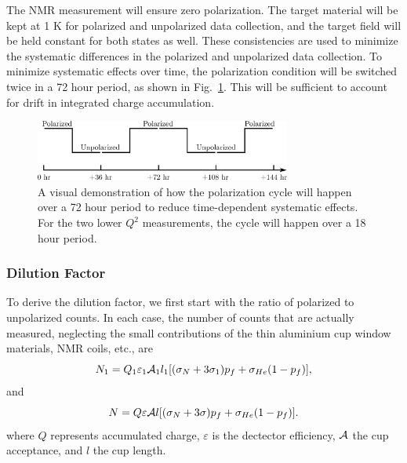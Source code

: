 The NMR measurement will ensure zero polarization.  The target material will be
kept at 1 K for polarized and unpolarized data collection, and the target field
will be held constant for both states as well.  These
consistencies are used to minimize the systematic differences in the
polarized and unpolarized data collection.  To minimize systematic effects over
time, the polarization condition will be switched twice in a 72 hour period, as shown in Fig.~\ref{fig:polcycle}. 
This will be sufficient to account for drift in integrated charge accumulation.

\begin{figure}
\centering
\includegraphics[width=0.75\textwidth,clip]{figs/pol_cycle.eps}
\caption{A visual demonstration of how the polarization cycle will happen over a 72 hour period to reduce time-dependent systematic effects. For the two lower $Q^2$ measurements, the cycle will happen over a 18 hour period.}  
\label{fig:polcycle}
\end{figure}



\subsubsection{Dilution Factor}
\label{dil}
To derive the dilution factor, we first start with the ratio of 
polarized to unpolarized counts.
In each case, the number of counts that are actually measured,  neglecting 
the small contributions of the thin aluminium cup window materials, NMR coils, etc.,
are
\begin{equation}
N_1=Q_1\varepsilon_1 {\cal A}_1 l_1[(\sigma_N+3\sigma_1)p_f+\sigma_{He}(1-p_f)],
\end{equation}
and
\begin{equation}
N=Q\varepsilon {\cal A}l[(\sigma_N+3\sigma)p_f+\sigma_{He}(1-p_f)].
\end{equation}
where $Q$ represents accumulated charge, $\varepsilon$ is the dectector 
efficiency, ${\cal A}$ the cup acceptance, and $l$ the cup length.  

